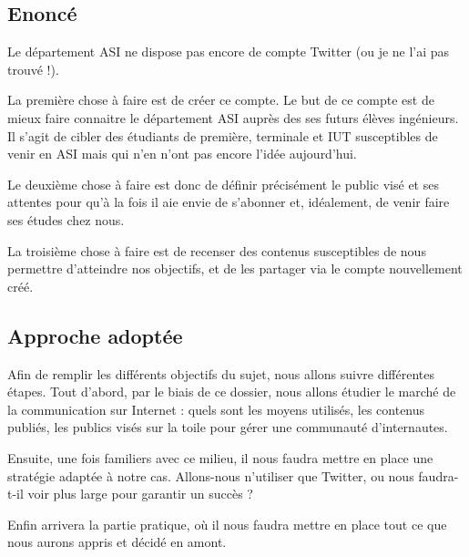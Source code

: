 \subsection{Enoncé}
Le département ASI ne dispose pas encore de compte Twitter (ou je ne l'ai pas trouvé !).
 
La première chose à faire est de créer ce compte. Le but de ce compte est de mieux faire connaitre le département ASI auprès des 
ses futurs élèves ingénieurs. Il s'agit de cibler des étudiants de première, terminale et IUT susceptibles de venir en ASI mais qui 
n'en n'ont pas encore l'idée aujourd'hui. 
 
Le deuxième chose à faire est donc de définir précisément le public visé et ses attentes pour qu'à la fois il aie envie de s'abonner 
et, idéalement, de venir faire ses études chez nous.
 
La troisième chose à faire est de recenser des contenus susceptibles de nous permettre d'atteindre nos objectifs, et de les partager via 
le compte nouvellement créé. 

\subsection{Approche adoptée}
Afin de remplir les différents objectifs du sujet, nous allons suivre différentes étapes. Tout d'abord, par le biais de ce dossier, nous allons 
étudier le marché de la communication sur Internet : quels sont les moyens utilisés, les contenus publiés, les publics visés sur la toile 
pour gérer une communauté d'internautes.

Ensuite, une fois familiers avec ce milieu, il nous faudra mettre en place une stratégie adaptée à notre cas. Allons-nous n'utiliser que Twitter, ou 
nous faudra-t-il voir plus large pour garantir un succès ?

Enfin arrivera la partie pratique, où il nous faudra mettre en place tout ce que nous aurons appris et décidé en amont.
